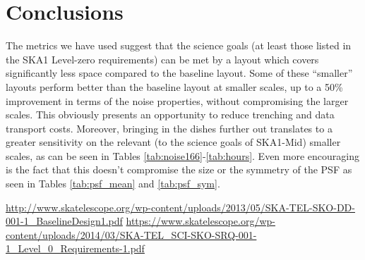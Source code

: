 \documentclass[sfheadings,a4paper,times,9pt,floats,floatfix]{article}
\begin{document}
\section{Conclusions}\label{sec:conclusion}
\vspace{-.1cm}
The metrics we have used suggest that the science goals (at least those listed in the SKA1 Level-zero requirements) can be met by
a layout which covers significantly less space compared to the baseline layout. Some of these ``smaller'' layouts perform better
than the baseline layout at smaller scales, up to a 50\% improvement in terms of the noise properties, without compromising the
larger scales. This obviously presents an opportunity to reduce trenching and data transport costs. Moreover, bringing in the
dishes further out translates to a greater sensitivity on the relevant (to the science goals of SKA1-Mid) smaller scales, as can
be seen in Tables \ref{tab:noise166}-\ref{tab:hours}. Even more encouraging is the fact that this doesn't compromise the size or
the symmetry of the PSF as seen in Tables \ref{tab:psf_mean} and \ref{tab:psf_sym}.
\vspace{-.5cm}
\begin{thebibliography}{99}
  \url{http://www.skatelescope.org/wp-content/uploads/2013/05/SKA-TEL-SKO-DD-001-1_BaselineDesign1.pdf}
  \url{https://www.skatelescope.org/wp-content/uploads/2014/03/SKA-TEL_SCI-SKO-SRQ-001-1_Level_0_Requirements-1.pdf}
\end{thebibliography}
\vspace{-.2cm}

\vspace{-.3cm}

\vspace{-.3cm}

\vspace{-.3cm}

\vspace{-.3cm}

\vspace{-.3cm}

\end{document}
